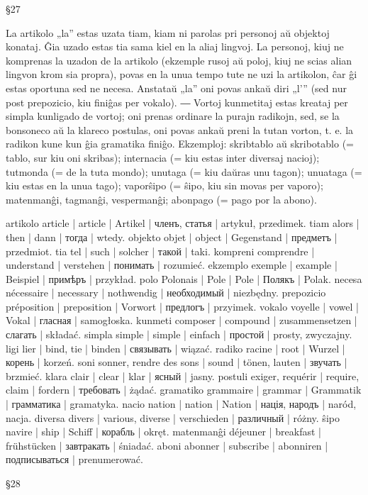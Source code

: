 §27

La artikolo „la” estas uzata tiam, kiam ni parolas pri personoj aŭ objektoj konataj. Ĝia uzado estas tia sama kiel en la aliaj lingvoj. La personoj, kiuj ne komprenas la uzadon de la artikolo (ekzemple rusoj aŭ poloj, kiuj ne scias alian lingvon krom sia propra), povas en la unua tempo tute ne uzi la artikolon, ĉar ĝi estas oportuna sed ne necesa. Anstataŭ „la” oni povas ankaŭ diri „l’” (sed nur post prepozicio, kiu finiĝas per vokalo). ― Vortoj kunmetitaj estas kreataj per simpla kunligado de vortoj; oni prenas ordinare la purajn radikojn, sed, se la bonsoneco aŭ la klareco postulas, oni povas ankaŭ preni la tutan vorton, t. e. la radikon kune kun ĝia gramatika finiĝo. Ekzemploj: skribtablo aŭ skribotablo (= tablo, sur kiu oni skribas); internacia (= kiu estas inter diversaj nacioj); tutmonda (= de la tuta mondo); unutaga (= kiu daŭras unu tagon); unuataga (= kiu estas en la unua tago); vaporŝipo (= ŝipo, kiu sin movas per vaporo); matenmanĝi, tagmanĝi, vespermanĝi; abonpago (= pago por la abono).

artikolo article | article | Artikel | членъ, статья | artykuł, przedimek.
tiam alors | then | dann | тогда | wtedy.
objekto objet | object | Gegenstand | предметъ | przedmiot.
tia tel | such | solcher | такой | taki.
kompreni comprendre | understand | verstehen | понимать | rozumieć.
ekzemplo exemple | example | Beispiel | примѣръ | przykład.
polo Polonais | Pole | Pole | Полякъ | Polak.
necesa nécessaire | necessary | nothwendig | необходимый | niezbędny.
prepozicio préposition | preposition | Vorwort | предлогъ | przyimek.
vokalo voyelle | vowel | Vokal | гласная | samogłoska.
kunmeti composer | compound | zusammensetzen | слагать | składać.
simpla simple | simple | einfach | простой | prosty, zwyczajny.
ligi lier | bind, tie | binden | связывать | wiązać.
radiko racine | root | Wurzel | корень | korzeń.
soni sonner, rendre des sons | sound | tönen, lauten | звучать | brzmieć.
klara clair | clear | klar | ясный | jasny.
postuli exiger, requérir | require, claim | fordern | требовать | żądać.
gramatiko grammaire | grammar | Grammatik | грамматика | gramatyka.
nacio nation | nation | Nation | нація, народъ | naród, nacja.
diversa divers | various, diverse | verschieden | различный | różny.
ŝipo navire | ship | Schiff | корабль | okręt.
matenmanĝi déjeuner | breakfast | frühstücken | завтракать | śniadać.
aboni abonner | subscribe | abonniren | подписываться | prenumerować.

§28

